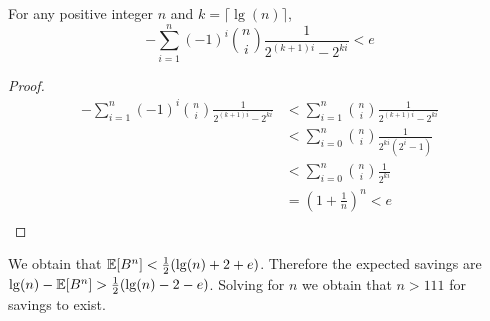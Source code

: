 \begin{lemma}
  For any positive integer $n$ and $k=\lceil \lg(n) \rceil$,
  \[
    -\sum_{i=1}^n (-1)^i {n \choose i} \frac{1}{2^{(k+1)i} - 2^{ki}} < e
  \]
\end{lemma}
\begin{proof}
  \begin{align*}
    -\sum_{i=1}^n (-1)^i {n \choose i} \frac{1}{2^{(k+1)i} - 2^{ki}}
    &< \sum_{i=1}^n {n \choose i} \frac{1}{2^{(k+1)i} - 2^{ki}} \\
    &< \sum_{i=0}^n {n \choose i} \frac{1}{2^{ki}(2^i-1)} \\
    &< \sum_{i=0}^n {n \choose i} \frac{1}{2^{ki}} \\
    &= (1+\frac{1}{n})^n < e \\
  \end{align*}
\end{proof}


We obtain that $\operatorname{\mathbb{E}}[B^n] < \frac{1}{2}(\lg(n)+2+e)$. Therefore the expected savings are $\lg(n) - \operatorname{\mathbb{E}}[B^n] > \frac{1}{2}(\lg(n)-2-e)$. Solving for $n$ we obtain that $n > 111$ for savings to exist.
